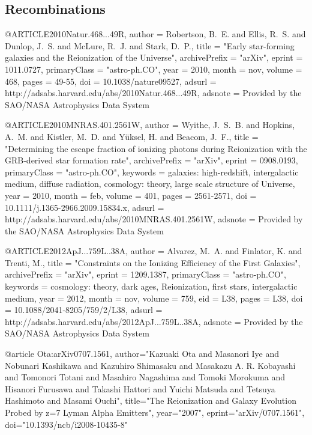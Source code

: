 \documentclass{article}
\begin{document}
\subsection{Recombinations}


@ARTICLE{2010Natur.468...49R,
   author = {{Robertson}, B.~E. and {Ellis}, R.~S. and {Dunlop}, J.~S. and 
	{McLure}, R.~J. and {Stark}, D.~P.},
    title = "{Early star-forming galaxies and the Reionization of the Universe}",
archivePrefix = "arXiv",
   eprint = {1011.0727},
 primaryClass = "astro-ph.CO",
     year = 2010,
    month = nov,
   volume = 468,
    pages = {49-55},
      doi = {10.1038/nature09527},
   adsurl = {http://adsabs.harvard.edu/abs/2010Natur.468...49R},
  adsnote = {Provided by the SAO/NASA Astrophysics Data System}
}

@ARTICLE{2010MNRAS.401.2561W,
   author = {{Wyithe}, J.~S.~B. and {Hopkins}, A.~M. and {Kistler}, M.~D. and 
	{Y{\"u}ksel}, H. and {Beacom}, J.~F.},
    title = "{Determining the escape fraction of ionizing photons during Reionization with the GRB-derived star formation rate}",
archivePrefix = "arXiv",
   eprint = {0908.0193},
 primaryClass = "astro-ph.CO",
 keywords = {galaxies: high-redshift, intergalactic medium, diffuse radiation, cosmology: theory, large scale structure of Universe},
     year = 2010,
    month = feb,
   volume = 401,
    pages = {2561-2571},
      doi = {10.1111/j.1365-2966.2009.15834.x},
   adsurl = {http://adsabs.harvard.edu/abs/2010MNRAS.401.2561W},
  adsnote = {Provided by the SAO/NASA Astrophysics Data System}
}
	
@ARTICLE{2012ApJ...759L..38A,
   author = {{Alvarez}, M.~A. and {Finlator}, K. and {Trenti}, M.},
    title = "{Constraints on the Ionizing Efficiency of the First Galaxies}",
archivePrefix = "arXiv",
   eprint = {1209.1387},
 primaryClass = "astro-ph.CO",
 keywords = {cosmology: theory, dark ages, Reionization, first stars, intergalactic medium},
     year = 2012,
    month = nov,
   volume = 759,
      eid = {L38},
    pages = {L38},
      doi = {10.1088/2041-8205/759/2/L38},
   adsurl = {http://adsabs.harvard.edu/abs/2012ApJ...759L..38A},
  adsnote = {Provided by the SAO/NASA Astrophysics Data System}
}  

@article {Ota:arXiv0707.1561,
author="Kazuaki Ota and Masanori Iye and Nobunari Kashikawa and Kazuhiro Shimasaku and Masakazu A. R. Kobayashi and Tomonori Totani and Masahiro Nagashima and Tomoki Morokuma and Hisanori Furusawa and Takashi Hattori and Yuichi Matsuda and Tetsuya Hashimoto and Masami Ouchi",
title="The Reionization and Galaxy Evolution Probed by z=7 Lyman Alpha Emitters",
year="2007",
eprint="arXiv/0707.1561",
doi="10.1393/ncb/i2008-10435-8"
} 
\end{document}
